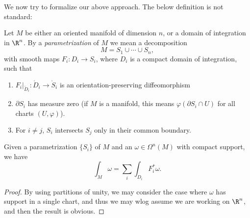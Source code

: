 \documentclass[a4paper]{article}
\begin{document}
We now try to formalize our above approach. The below definition is not standard:
\begin{defi}[Parametrization]
  Let $M$ be either an oriented manifold of dimension $n$, or a domain of integration in $\R^n$. By a \emph{parametrization} of $M$ we mean a decomposition
  \[
    M = S_1 \cup \cdots \cup S_n,
  \]
  with smooth maps $F_i: D_i \to S_i$, where $D_i$ is a compact domain of integration, such that
  \begin{enumerate}
    \item $F_i|_{\mathring{D}_i}: \mathring{D}_i \to \mathring{S}_i$ is an orientation-preserving diffeomorphism
    \item $\partial S_i$ has measure zero (if $M$ is a manifold, this means $\varphi(\partial S_i \cap U)$ for all charts $(U, \varphi)$).
    \item For $i \not= j$, $S_i$ intersects $S_j$ only in their common boundary.
  \end{enumerate}
\end{defi}

\begin{thm}
  Given a parametrization $\{S_i\}$ of $M$ and an $\omega \in \Omega^n(M)$ with compact support, we have
  \[
    \int_M \omega = \sum_i \int_{D_i} F_i^* \omega.
  \]
\end{thm}

\begin{proof}

  By using partitions of unity, we may consider the case where $\omega$ has support in a single chart, and thus we may wlog assume we are working on $\R^n$, and then the result is obvious.
\end{proof}
\end{document}
